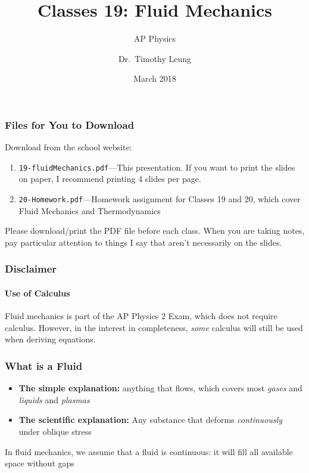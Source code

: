 \documentclass[12pt,aspectratio=169]{beamer}
\title{Classes 19: Fluid Mechanics}
\subtitle{AP Physics}
\author[TML]{Dr.\ Timothy Leung}
\institute{Olympiads School}
\date{March 2018}
\begin{document}
\begin{frame}
  \maketitle
\end{frame}



\begin{frame}
  \frametitle{Files for You to Download}
  Download from the school website:
  \begin{enumerate}
  \item\texttt{19-fluidMechanics.pdf}---This
    presentation. If you want to print the slides on paper, I recommend
    printing 4 slides per page.
  \item\texttt{20-Homework.pdf}---Homework assignment for Classes 19 and 20,
    which cover Fluid Mechanics and Thermodynamics
  \end{enumerate}

  \vspace{.2in}Please download/print the PDF file before each class. When you
  are taking notes, pay particular attention to things I say that aren't
  necessarily on the slides.
\end{frame}



\begin{frame}
  \frametitle{Disclaimer}
  \framesubtitle{Use of Calculus}
  Fluid mechanics is part of the AP Physics 2 Exam, which does not require
  calculus. However, in the interest in completeness, \emph{some} calculus will
  still be used when deriving equations.
\end{frame}



\begin{frame}
  \frametitle{What is a Fluid}

  \begin{itemize}
  \item\textbf{The simple explanation:} anything that flows, which covers
    most \emph{gases} and \emph{liquids} and \emph{plasmas}
  \item\textbf{The scientific explanation:} Any substance that deforms
    \emph{continuously} under oblique stress
  \end{itemize}

  \vspace{.2in}In fluid mechanics, we assume that a fluid is continuous:
  it will fill all available space without gaps
\end{frame}
\end{document}
